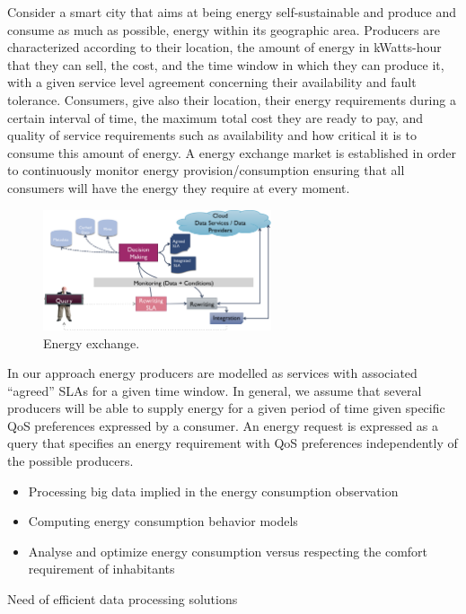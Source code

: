 Consider a smart city that aims at being energy self-sustainable and produce and consume as much as possible, energy within its geographic area. 
Producers are characterized according to their location, the amount of energy in kWatts-hour that they can sell, the cost, and the time window in which they can produce it, with a given service level agreement concerning their availability and fault tolerance. 
Consumers, give also their location, their energy requirements during a certain interval of time, the maximum total cost they are ready to pay, and quality of service requirements such as availability and how critical it is to consume this amount of energy. 
A energy exchange market is established in order to continuously monitor energy provision/consumption ensuring that all consumers will have the energy they require at every moment.

\begin{figure}
\includegraphics[width=0.6\textwidth]{figs/arch.png}
\caption{\label{fig:energyXChange} Energy exchange.}
\end{figure}

In our approach energy producers are modelled as services with associated ``agreed'' SLAs for a given time window. 
In general, we assume that several producers will be able to supply energy for a given period of time given specific QoS preferences expressed by a consumer. 
An energy request is expressed as a query that specifies an energy requirement with QoS preferences independently of the possible producers. 

\begin{itemize}
\item Processing big data implied in the energy consumption observation 
\item Computing energy consumption behavior models
\item Analyse and optimize energy consumption versus respecting the comfort requirement of inhabitants
\end{itemize}

Need of efficient data processing solutions
